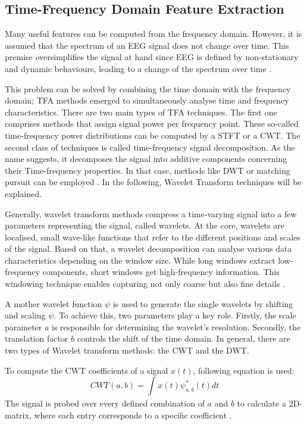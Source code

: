     \subsection{Time-Frequency Domain Feature Extraction}
      Many useful features can be computed from the frequency domain. However, it is assumed that the spectrum of an \ac{EEG} signal does not change over time. This premise oversimplifies the signal at hand since \ac{EEG} is defined by non-stationary and dynamic behaviours, leading to a change of the spectrum over time \cite{hu2019eeg}. \par
      This problem can be solved by combining the time domain with the frequency domain; \ac{TFA} methods emerged to simultaneously analyse time and frequency characteristics. There are two main types of \ac{TFA} techniques. The first one comprises methods that assign signal power per frequency point. These so-called time-frequency power distributions can be computed by a \ac{STFT} or a \ac{CWT}. The second class of techniques is called time-frequency signal decomposition. As the name suggests, it decomposes the signal into additive components concerning their Time-frequency properties. In that case, methods like \ac{DWT} or matching pursuit can be employed \cite{hu2019eeg}. In the following, Wavelet Transform techniques will be explained. \par
      Generally, wavelet transform methods compress a time-varying signal into a few parameters representing the signal, called wavelets. At the core, wavelets are localised, small wave-like functions that refer to the different positions and scales of the signal. Based on that, a wavelet decomposition can analyse various data characteristics depending on the window size. While long windows extract low-frequency components, short windows get high-frequency information. This windowing technique enables capturing not only coarse but also fine details \cite{al2014methods}. \par
      A mother wavelet function $\psi$ is used to generate the single wavelets by shifting and scaling $\psi$. To achieve this, two parameters play a key role. Firstly, the scale parameter $a$ is responsible for determining the wavelet's resolution. Secondly, the translation factor $b$ controls the shift of the time domain. In general, there are two types of Wavelet transform methods: the \ac{CWT} and the \ac{DWT}. \par
      To compute the \ac{CWT} coefficients of a signal $x(t)$, following equation is used:
      \begin{equation}
        CWT(a,b) = \int_{}^{}x(t)\psi_{a,b}^{*}(t)dt
      \end{equation}
      The signal is probed over every defined combination of $a$ and $b$ to calculate a 2D-matrix, where each entry corresponds to a specific coefficient \cite{al2014methods}. \par

